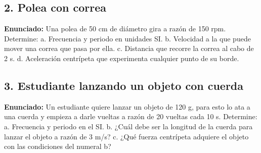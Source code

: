 \documentclass[12pt, letterpaper]{article}
\begin{document}
	\subsection*{2. Polea con correa}
	\noindent \textbf{Enunciado:} Una polea de 50 cm de diámetro gira a razón de 150 rpm. Determine: a. Frecuencia y periodo en unidades SI. b. Velocidad a la que puede mover una correa que pasa por ella. c. Distancia que recorre la correa al cabo de 2 s. d. Aceleración centrípeta que experimenta cualquier punto de su borde.
	
	
	\subsection*{3. Estudiante lanzando un objeto con cuerda}
	\noindent \textbf{Enunciado:} Un estudiante quiere lanzar un objeto de 120 g, para esto lo ata a una cuerda y empieza a darle vueltas a razón de 20 vueltas cada 10 s. Determine: a. Frecuencia y periodo en el SI. b. ¿Cuál debe ser la longitud de la cuerda para lanzar el objeto a razón de 3 m/s? c. ¿Qué fuerza centrípeta adquiere el objeto con las condiciones del numeral b?
	
\end{document}
